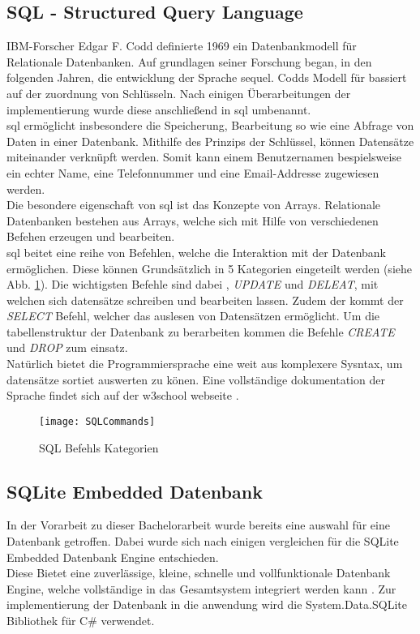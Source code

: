 \subsection{SQL - Structured Query Language}
IBM-Forscher Edgar F. Codd definierte 1969 ein Datenbankmodell für Relationale Datenbanken. Auf grundlagen seiner Forschung began, in den folgenden Jahren, die entwicklung der Sprache \ac{sequel}. Codds Modell für bassiert auf der zuordnung von Schlüsseln. Nach einigen Überarbeitungen der implementierung wurde diese anschließend in \ac{sql} umbenannt.\\
\ac{sql} ermöglicht insbesondere die Speicherung, Bearbeitung so wie eine Abfrage von Daten in einer Datenbank. Mithilfe des Prinzips der Schlüssel, können Datensätze miteinander verknüpft werden. Somit kann einem Benutzernamen bespielsweise ein echter Name, eine Telefonnummer und eine Email-Addresse zugewiesen werden.\\
Die besondere eigenschaft von \ac{sql} ist das Konzepte von Arrays. Relationale Datenbanken bestehen aus Arrays, welche sich mit Hilfe von verschiedenen Befehen erzeugen und bearbeiten. \cite{sql}\\
\ac{sql} beitet eine reihe von Befehlen, welche die Interaktion mit der Datenbank ermöglichen. Diese können Grundsätzlich in 5 Kategorien eingeteilt werden (siehe Abb. \ref{fig:SQLCommands}). Die wichtigsten Befehle sind dabei , \textit{UPDATE} und \textit{DELEAT}, mit welchen sich datensätze schreiben und bearbeiten lassen. Zudem der kommt der \textit{SELECT} Befehl, welcher das auslesen von Datensätzen ermöglicht. Um die tabellenstruktur der Datenbank zu berarbeiten kommen die Befehle \textit{CREATE} und \textit{DROP} zum einsatz. \cite{SQLCommands}\\
Natürlich bietet die Programmiersprache eine weit aus komplexere Sysntax, um datensätze sortiet auswerten zu könen. Eine vollständige dokumentation der Sprache findet sich auf der w3school webseite \cite{SQLDoku}.
\begin{center}
    \begin{figure}[h!]
     \centering
     \texttt{[image: SQLCommands]}
     \caption{SQL Befehls Kategorien \cite{SQLCommands}}
    \label{fig:SQLCommands}
    \end{figure}
   \end{center}

\subsection{SQLite Embedded Datenbank}
In der Vorarbeit zu dieser Bachelorarbeit wurde bereits eine auswahl für eine Datenbank getroffen. Dabei wurde sich nach einigen vergleichen für die SQLite Embedded Datenbank Engine entschieden. \\
Diese Bietet eine zuverlässige, kleine, schnelle und vollfunktionale Datenbank Engine, welche vollständige in das Gesamtsystem integriert werden kann \cite{SQLiteHompage}. Zur implementierung der Datenbank in die anwendung wird die System.Data.SQLite Bibliothek für C\# verwendet.\\